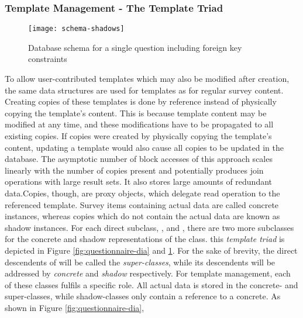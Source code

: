     \subsubsection{Template Management - The Template Triad}
    \label{section:implementation:template-triad}
        \begin{figure}
            \centering
            \texttt{[image: schema-shadows]}
            \caption{Database schema for a single question including foreign key constraints}
            \label{fig:schema-shadows}
        \end{figure}

        To allow user-contributed templates which may also be modified after
        creation, the same data structures are used for templates as for
        regular survey content. Creating copies of these templates is done by
        reference instead of physically copying the template's content.
        This is because template content may be modified
        at any time, and these modifications have to be propagated to
        all existing copies. If copies were created by physically
        copying the template's content, updating a template would
        also cause all copies to be updated in the database. The
        asymptotic number of block accesses of this approach scales linearly
        with the number of copies present and potentially produces
        join operations with large result sets. It also stores
        large amounts of redundant data.Copies, though, are
        proxy objects, which delegate read operation to the referenced
        template. Survey items containing actual data are called
        concrete instances, whereas copies which do not contain
        the actual data are known as shadow instances.
        For each direct  subclass, , 
        and , there are two more subclasses for the concrete and shadow
        representations of the class. this \textit{template triad} is depicted in 
        Figure \ref{fig:questionnaire-dia} and \ref{fig:schema-shadows}. For the sake of brevity,
        the direct descendents of  will be called the \textit{super-classes},
        while its descendents will be addressed by \textit{concrete} and \textit{shadow}
        respectively. For template management,
        each of these classes fulfils a specific role. All actual data is stored
        in the concrete- and super-classes, while shadow-classes only
        contain a reference to a concrete. As shown in Figure \ref{fig:questionnaire-dia},

